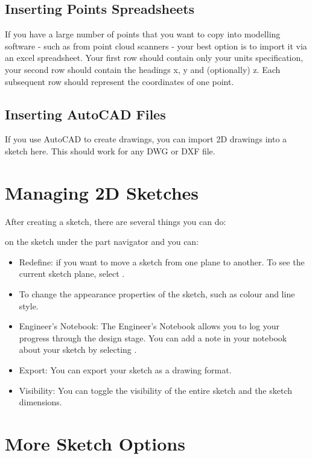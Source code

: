 \begin{enumerate}
\cbend

\subsection{Inserting Points Spreadsheets}

\cbstart
{}
If you have a large number of points that you want to copy into modelling software - such as from point cloud scanners - your best option is to import it via an excel spreadsheet. Your first row should contain only your units specification, your second row should contain the headings x, y and (optionally) z. Each subsequent row should represent the coordinates of one point.
\cbend

\subsection{Inserting AutoCAD Files}\cbstart
If you use AutoCAD to create drawings, you can import 2D drawings into a sketch here. This should work for any DWG or DXF file.
\cbend
\section{Managing 2D Sketches}

\cbstart
{}

After creating a sketch, there are several things you can do:

 on the sketch under the part navigator and you can:
\begin{itemize}
\item Redefine: if you want to move a sketch from one plane to another. To see the current sketch plane, select .
\item To change the appearance properties of the sketch, such as colour and line style.
\item Engineer's Notebook: The Engineer's Notebook allows you to log your progress through the design stage. You can add a note in your notebook about your sketch by selecting .
\item Export: You can export your sketch as a drawing format.
\item Visibility: You can toggle the visibility of the entire sketch and the sketch dimensions.
\end{itemize}

\cbend

\section{More Sketch Options}
\cbstart
{}


\end{enumerate}
